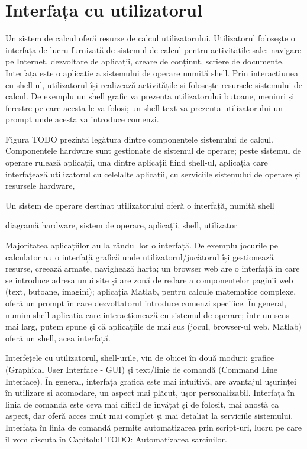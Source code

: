 \chapter{Interfața cu utilizatorul}
\label{chapter:ui}

Un sistem de calcul oferă resurse de calcul utilizatorului. Utilizatorul folosește o interfața de lucru furnizată de sistemul de calcul pentru activitățile sale: navigare pe Internet, dezvoltare de aplicații, creare de conținut, scriere de documente. Interfața este o aplicație a sistemului de operare numită shell. Prin interacțiunea cu shell-ul, utilizatorul își realizează activitățile și folosește resursele sistemului de calcul. De exemplu un shell grafic va prezenta utilizatorului butoane, meniuri și ferestre pe care acesta le va folosi; un shell text va prezenta utilizatorului un prompt unde acesta va introduce comenzi.

Figura TODO prezintă legătura dintre componentele sistemului de calcul. Componentele hardware sunt gestionate de sistemul de operare; peste sistemul de operare rulează aplicații, una dintre aplicații fiind shell-ul, aplicația care interfațează utilizatorul cu celelalte aplicații, cu serviciile sistemului de operare și resursele hardware,

Un sistem de operare destinat utilizatorului oferă o interfață, numită shell

diagramă hardware, sistem de operare, aplicații, shell, utilizator

Majoritatea aplicațiilor au la rândul lor o interfață. De exemplu jocurile pe calculator au o interfață grafică unde utilizatorul/jucătorul își gestionează resurse, creează armate, navighează harta; un browser web are o interfață în care se introduce adresa unui site și are zonă de redare a componentelor paginii web (text, butoane, imagini); aplicația Matlab, pentru calcule matematice complexe, oferă un prompt în care dezvoltatorul introduce comenzi specifice. În general, numim shell aplicația care interacționează cu sistemul de operare; într-un sens mai larg, putem spune și că aplicațiile de mai sus (jocul, browser-ul web, Matlab) oferă un shell, acea interfață.

Interfețele cu utilizatorul, shell-urile, vin de obicei în două moduri: grafice (Graphical User Interface - GUI) și text/linie de comandă (Command Line Interface). În general, interfața grafică este mai intuitivă, are avantajul ușurinței în utilizare și acomodare, un aspect mai plăcut, ușor personalizabil. Interfața în linia de comandă este ceva mai dificil de învățat și de folosit, mai anostă ca aspect, dar oferă acces mult mai complet și mai detaliat la serviciile sistemului. Interfața în linia de comandă permite automatizarea prin script-uri, lucru pe care îl vom discuta în Capitolul TODO: Automatizarea sarcinilor.

